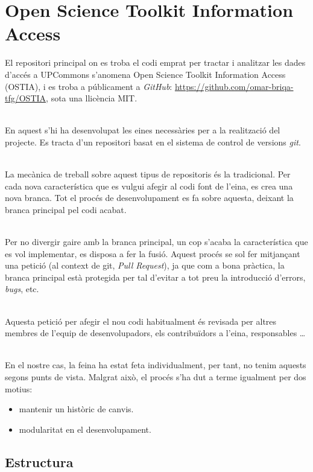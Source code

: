 \chapter{Open Science Toolkit Information Access}\label{ch:ostia}
El repositori principal on es troba el codi emprat per tractar i analitzar les dades d'accés a \gls{UPCommons} s'anomena Open Science Toolkit Information Access (\gls{OSTIA}), i es troba a públicament a \textit{GitHub}: \url{https://github.com/omar-briqa-tfg/OSTIA}, sota una llicència MIT.

\noindent \\
En aquest s'hi ha desenvolupat les eines necessàries per a la realització del projecte.
Es tracta d'un repositori basat en el sistema de control de versions \textit{\gls{git}}.

\noindent \\
La mecànica de treball sobre aquest tipus de repositoris és la tradicional.
Per cada nova característica que es vulgui afegir al codi font de l'eina, es crea una nova branca.
Tot el procés de desenvolupament es fa sobre aquesta, deixant la branca principal pel codi acabat.

\noindent \\
Per no divergir gaire amb la branca principal, un cop s'acaba la característica que es vol implementar, es disposa a fer la fusió.
Aquest procés se sol fer mitjançant una petició (al context de git, \textit{Pull Request}), ja que com a bona pràctica, la branca principal està protegida per tal d'evitar a tot preu la introducció d'errors, \textit{bugs}, etc.

\noindent \\
Aquesta petició per afegir el nou codi habitualment és revisada per altres membres de l'equip de desenvolupadors, els contribuïdors a l'eina, responsables \dots

\noindent \\
En el nostre cas, la feina ha estat feta individualment, per tant, no tenim aquests segons punts de vista.
Malgrat això, el procés s'ha dut a terme igualment per dos motius:

\begin{itemize}
    \item mantenir un històric de canvis.
    \item modularitat en el desenvolupament.
\end{itemize}{}

\clearpage

\section*{Estructura}\label{sec:ostia-structure}

